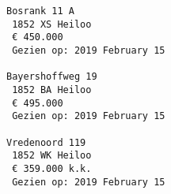 \documentclass[11pt]{article}
\begin{document}
    \begin{Verbatim}[commandchars=\\\{\}]
Bosrank 11 A
 1852 XS Heiloo
 € 450.000 
 Gezien op: 2019 February 15

Bayershoffweg 19
 1852 BA Heiloo
 € 495.000 
 Gezien op: 2019 February 15

Vredenoord 119
 1852 WK Heiloo
 € 359.000 k.k.
 Gezien op: 2019 February 15


    \end{Verbatim}


    
    
    
    
\end{document}
